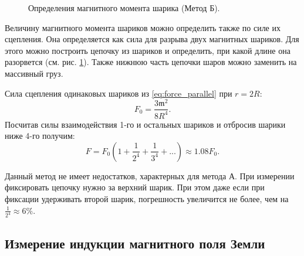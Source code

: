 \documentclass[12pt,a4paper]{article}
\newcommand{\figref}[1]{(см. рис. \ref{#1})}
\begin{document}
	\begin{figure}
		\vspace{-20pt}
		\caption{Определения магнитного момента шарика (Метод Б).}
		\label{img:method_b}
		\vspace{-10pt}
	\end{figure}
	Величину магнитного момен­та шариков можно определить также по си­ле их сцепления. Она определяется как сила для разрыва двух магнитных шариков. Для этого можно построить цепочку из шариков и определить, при какой длине она разорвется \figref{img:method_b}. Также нижнюю часть цепочки шаров можно заменить на массивный груз.
	
	Сила сцепления одинаковых шариков из \eqref{eq:force_parallel} при $r=2R$:
	$$ F_0 = \frac{3\mathfrak{m}^2}{8 R^4}. $$
	Посчитав силы взаимодействия 1-го и остальных шариков и отбросив шарики ниже 4-го получим:
	$$ F = F_0(1 + \frac{1}{2^4} + \frac{1}{3^4} + ...) \approx 1.08 F_0. $$
	
	Данный метод не имеет недостатков, характерных для метода А. При измерении фиксировать цепочку нужно за верхний шарик. При этом даже если при фиксации удерживать второй шарик, погрешность увеличится не более, чем на $\frac{1}{2^4} \approx 6\%$.
		
	\subsection*{Измерение индукции магнитного поля Земли}
	
\end{document}
